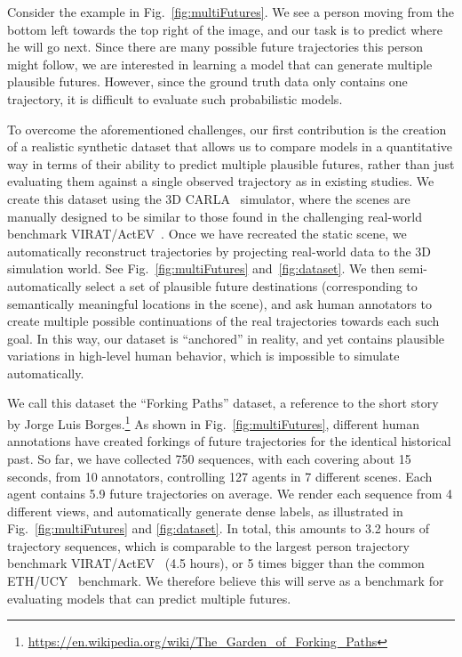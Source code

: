 \documentclass[10pt,twocolumn,letterpaper]{article}
\newcommand{\eat}[1]{}
\begin{document}
Consider the example in Fig.~\ref{fig:multiFutures}.
We see a person moving from the bottom left towards the top right of
the image, and our task is to predict where he will go next.
Since there are many possible future trajectories this person
might follow, we are interested in learning a model
that can generate multiple plausible futures.
However, since the ground truth data only contains one trajectory, it is difficult to evaluate such
probabilistic models.
\eat{
However as we see in Fig.~\ref{fig:multiFutures}, where the green line is the ground truth future trajectory and the orange heatmaps are example future predictions, the plausible predictions around the cars will not be considered correct in existing datasets.
}


To overcome the aforementioned challenges,
our first contribution is the creation of a realistic synthetic dataset that allows us to compare models in a quantitative way in terms of their ability to predict multiple plausible futures,
rather than just evaluating them against a single observed trajectory as in existing studies.
We create this dataset using the
3D CARLA~\cite{dosovitskiy2017carla} simulator, where the scenes are manually designed to be similar to those found in the  challenging real-world benchmark VIRAT/ActEV~\cite{oh2011large,2018trecvidawad}.
Once we have recreated the static scene, we automatically reconstruct trajectories by projecting real-world data to the 3D simulation world. See Fig.~\ref{fig:multiFutures} and~\ref{fig:dataset}.
We then semi-automatically select a set of plausible future destinations (corresponding to semantically meaningful locations in the scene), and ask human annotators to create multiple possible
continuations of the real trajectories towards each such goal. In this way, our dataset is ``anchored'' in reality,
and yet contains plausible variations in high-level human behavior, which is impossible to simulate automatically.


We call this dataset the ``Forking Paths'' dataset,
a reference to the short story by Jorge Luis Borges.\footnote{
\footnotesize{\url{https://en.wikipedia.org/wiki/The_Garden_of_Forking_Paths}}
} As shown in Fig.~\ref{fig:multiFutures}, different human annotations have created forkings of future trajectories for the identical historical past.
So far, we have collected 750 sequences, with each covering about 15 seconds, 
from 10 annotators, controlling 127 agents in 7 different scenes. 
Each agent contains 5.9 future trajectories on average.
We render each sequence from 4 different views,
and automatically generate dense labels,
as illustrated in Fig.~\ref{fig:multiFutures} and \ref{fig:dataset}.
In total,
this amounts to 3.2 hours of trajectory sequences, which is comparable to the largest person trajectory benchmark VIRAT/ActEV~\cite{2018trecvidawad, oh2011large} (4.5 hours), or 5 times bigger than the common ETH/UCY~\cite{lerner2007crowds,luber2010people} benchmark.
We therefore believe this will serve as a benchmark
for evaluating models that can predict multiple futures.
\end{document}
